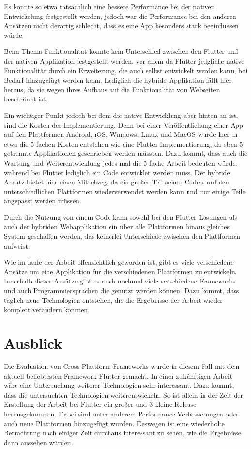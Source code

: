Es konnte so etwa tatsächlich eine bessere Performance bei der nativen Entwickelung festgestellt werden, jedoch war die Performance bei den anderen Ansätzen nicht derartig schlecht, dass es eine App besonders stark beeinflussen würde. 

Beim Thema Funktionalität konnte kein Unterschied zwischen den Flutter und der nativen Applikation festgestellt werden, vor allem da Flutter jedgliche native Funktionalität durch ein Erweiterung, die auch selbst entwickelt werden kann, bei Bedarf hinzugefügt werden kann. Lediglich die hybride Applikation fällt hier heraus, da sie wegen ihres Aufbaus auf die Funktionalität von Webseiten beschränkt ist.

Ein wichtiger Punkt jedoch bei dem die native Entwicklung aber hinten an ist, sind die Kosten der Implementierung. Denn bei einer Veröffentlichung einer App auf den Plattformen Android, iOS, Windows, Linux und MacOS würde hier in etwa die 5 fachen Kosten entstehen wie eine Flutter Implementierung, da eben 5 getrennte Applikationen geschrieben werden müssten. Dazu kommt, dass auch die Wartung und Weiterentwicklung jedes mal die 5 fache Arbeit bedeuten würde, während bei Flutter lediglich ein Code entwicklet werden muss. Der hybride Ansatz bietet hier einen Mittelweg, da ein großer Teil seines Code s auf den unterschiedlichen Plattformen wiederverwendet werden kann und nur einige Teile angepasst werden müssen. 

Durch die Nutzung von einem Code kann sowohl bei den Flutter Lösungen als auch der hybriden Webapplikation ein über alle Plattformen hinaus gleiches System geschaffen werden, das keinerlei Unterschiede zwischen den Plattformen aufweist. 


Wie im laufe der Arbeit offensichtlich geworden ist, gibt es viele verschiedene Ansätze um eine Applikation für die verschiedenen Plattformen zu entwickeln. Innerhalb dieser Ansätze gibt es auch nochmal viele verschiedene Frameworks und auch Programmiersprachen die genutzt werden können. Dazu kommt, dass täglich neue Technologien entstehen, die die Ergebnisse der Arbeit wieder komplett verändern könnten.




\section{Ausblick}
Die Evaluation von Cross-Plattform Frameworks wurde in diesem Fall mit dem aktuell beliebtesten Framework Flutter gemacht. In einer zukünftigen Arbeit wäre eine Untersuchung weiterer Technologien sehr interessant. Dazu kommt, dass die untersuchten Technologien weiterentwickeln. So ist allein in der Zeit der Erstellung der Arbeit bei Flutter ein großer und 3 kleine Release herausgekommen. Dabei sind unter anderem Performance Verbesserungen oder auch neue Plattformen hinzugefügt wurden. Deswegen ist eine wiederholte Betrachtung nach einiger Zeit durchaus interessant zu sehen, wie die Ergebnisse dann aussehen würden.

